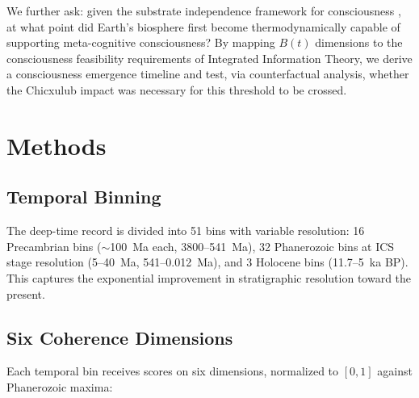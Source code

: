 \documentclass[10pt,letterpaper]{article}
\newcommand{\bt}{$B(t)$}
\begin{document}
We further ask: given the substrate independence framework for consciousness
\cite{putnam1967, tononi2004, chalmers2010}, at what point did Earth's biosphere
first become thermodynamically capable of supporting meta-cognitive consciousness?
By mapping \bt{} dimensions to the consciousness feasibility requirements of
Integrated Information Theory, we derive a consciousness emergence timeline and
test, via counterfactual analysis, whether the Chicxulub impact was necessary for
this threshold to be crossed.

\section*{Methods}

\subsection*{Temporal Binning}

The deep-time record is divided into 51 bins with variable resolution:
16 Precambrian bins ($\sim$100~Ma each, 3800--541~Ma), 32 Phanerozoic bins
at ICS stage resolution (5--40~Ma, 541--0.012~Ma), and 3 Holocene bins
(11.7--5~ka BP). This captures the exponential improvement in stratigraphic
resolution toward the present.

\subsection*{Six Coherence Dimensions}

Each temporal bin receives scores on six dimensions, normalized to $[0, 1]$
against Phanerozoic maxima:
\end{document}
